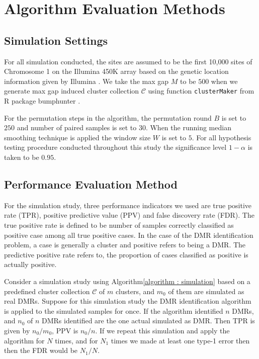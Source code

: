 \documentclass{report}
\begin{document}
\section{Algorithm Evaluation Methods}
\subsection{Simulation Settings}
\par
 For all simulation conducted, the sites are assumed to be
the first 10,000 sites of Chromosome 1 on the Illumina 450K array based on
the genetic location information given by Illumina \cite{Infinium}. We take the max gap $M$ to be $500$
when we generate max gap induced cluster collection $\mathcal{C}$ using function \verb|clusterMaker|
from R package bumphunter \cite{bumphunter,minfi}.
\par
For the permutation steps in the algorithm, the permutation round $B$ is set to $250$ and number of paired samples is set
to $30$. When the running median smoothing technique is applied the window size $W$ is set to $5$. For all hypothesis testing procedure
conducted throughout this study the significance level $1-\alpha$ is taken to be $0.95$.

\subsection{Performance Evaluation Method}
\par
For the simulation study,  three performance indicators we used are true
positive rate (TPR), positive predictive value (PPV) and false discovery rate (FDR). The true positive rate is defined to be number of samples
correctly classified as positive case among all true positive cases. In the case of the DMR identification problem, a case is generally a cluster and positive refers to being a DMR. The predictive positive rate refers to, the proportion of cases classified as positive is actually positive.

\par
Consider a simulation study using Algorithm\ref{algorithm : simulation} based on a predefined cluster collection $\mathcal{C}$
of $m$ clusters, and $m_0$ of them are simulated as real DMRs. Suppose for this simulation study the DMR identification algorithm
is applied to the simulated samples for once. If the algorithm identified $n$ DMRs, and $n_0$ of $n$ DMRs identified are the one
actual simulated as DMR. Then TPR is given by $n_0/m_0$, PPV is $ n_0/n$. If we repeat this simulation and apply
the algorithm for $N$ times, and for $N_1$ times we made at least one type-1 error then
then the FDR would be $N_1/N$.
\end{document}
